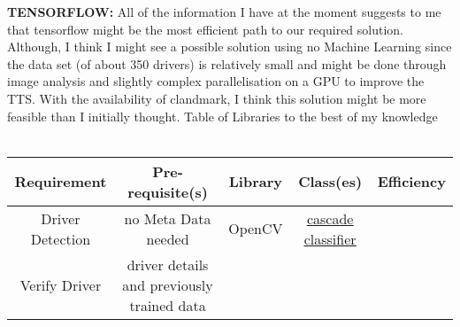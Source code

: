 \documentclass{article}
\begin{document}
\textbf{TENSORFLOW:}
    All of the information I have at the moment suggests to me that tensorflow might be the most efficient path to our required 
    solution. Although, I think I might see a possible solution using no Machine Learning since the data set (of about 350 drivers)
    is relatively small and might be done through image analysis and slightly complex parallelisation on a GPU to improve the TTS. 
    With the availability of clandmark, I think this solution might be more feasible than I initially thought.
\newpage
\Large{Table of Libraries to the best of my knowledge}
\\ \vspace{1cm} \\
\begin{tabular}{ | c | c | c | c | c |}
    \hline
    Requirement & Pre-requisite(s) & Library & Class(es) & Efficiency \\
    \hline  
    Driver Detection & no Meta Data needed & OpenCV & \href{http://docs.opencv.org/2.4/doc/tutorials/objdetect/cascade_classifier/cascade_classifier.html}{\underline{cascade classifier}} & \\ \hline
    Verify Driver & driver details and \newline previously trained data & & & \\
    \hline
  \end{tabular}
\end{document}
